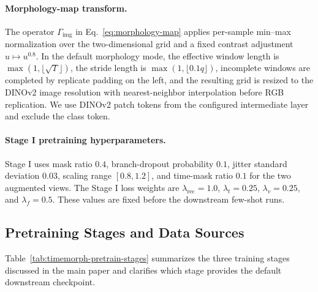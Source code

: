 \documentclass{article}
\begin{document}
\paragraph{Morphology-map transform.}
The operator $\Gamma_{\mathrm{img}}$ in Eq.~\ref{eq:morphology-map} applies per-sample min--max normalization over the two-dimensional grid and a fixed contrast adjustment $u\mapsto u^{0.8}$. In the default morphology mode, the effective window length is $\max(1,\lfloor\sqrt{T}\rfloor)$, the stride length is $\max(1,\lfloor 0.1q\rfloor)$, incomplete windows are completed by replicate padding on the left, and the resulting grid is resized to the DINOv2 image resolution with nearest-neighbor interpolation before RGB replication. We use DINOv2 patch tokens from the configured intermediate layer and exclude the class token.

\paragraph{Stage I pretraining hyperparameters.}
Stage I uses mask ratio $0.4$, branch-dropout probability $0.1$, jitter standard deviation $0.03$, scaling range $[0.8,1.2]$, and time-mask ratio $0.1$ for the two augmented views. The Stage I loss weights are $\lambda_{\mathrm{rec}}=1.0$, $\lambda_t=0.25$, $\lambda_v=0.25$, and $\lambda_f=0.5$. These values are fixed before the downstream few-shot runs.

\subsection{Pretraining Stages and Data Sources}
\label{app:pretrain-details}

Table~\ref{tab:timemorph-pretrain-stages} summarizes the three training stages discussed in the main paper and clarifies which stage provides the default downstream checkpoint.
\end{document}
